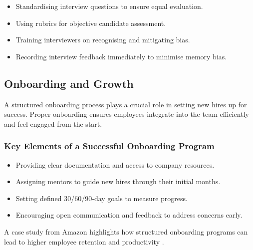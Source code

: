 \begin{itemize}
    \item Standardising interview questions to ensure equal evaluation.
    \item Using rubrics for objective candidate assessment.
    \item Training interviewers on recognising and mitigating bias.
    \item Recording interview feedback immediately to minimise memory bias.
\end{itemize}

\subsection{Onboarding and Growth}

A structured onboarding process plays a crucial role in setting new hires up for success. Proper onboarding ensures employees integrate into the team efficiently and feel engaged from the start.

\subsubsection{Key Elements of a Successful Onboarding Program}

\begin{itemize}
    \item Providing clear documentation and access to company resources.
    \item Assigning mentors to guide new hires through their initial months.
    \item Setting defined 30/60/90-day goals to measure progress.
    \item Encouraging open communication and feedback to address concerns early.
\end{itemize}

A case study from Amazon highlights how structured onboarding programs can lead to higher employee retention and productivity \cite{AmazonOnboarding}.

